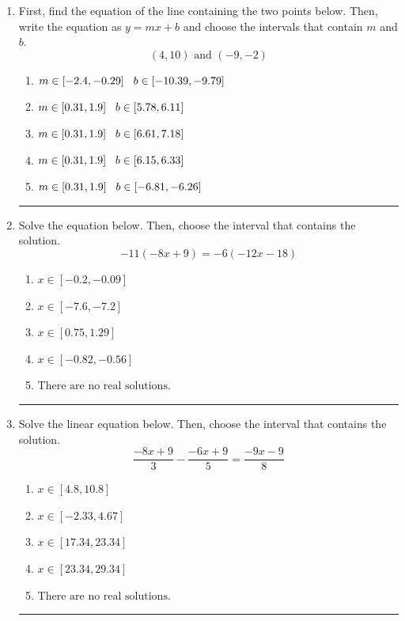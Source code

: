 \documentclass[14pt]{extbook}
\newcommand{\litem}[1]{\item#1\hspace*{-1cm}\rule{\textwidth}{0.4pt}}
\begin{document}
\begin{enumerate}
{\begin{enumerate}[label=\Alph*.]
\end{enumerate} }
\litem{
First, find the equation of the line containing the two points below. Then, write the equation as $ y=mx+b $ and choose the intervals that contain $m$ and $b$.\[ (4, 10) \text{ and } (-9, -2) \]\begin{enumerate}[label=\Alph*.]
\item \( m \in [-2.4, -0.29] \hspace*{3mm} b \in [-10.39, -9.79] \)
\item \( m \in [0.31, 1.9] \hspace*{3mm} b \in [5.78, 6.11] \)
\item \( m \in [0.31, 1.9] \hspace*{3mm} b \in [6.61, 7.18] \)
\item \( m \in [0.31, 1.9] \hspace*{3mm} b \in [6.15, 6.33] \)
\item \( m \in [0.31, 1.9] \hspace*{3mm} b \in [-6.81, -6.26] \)

\end{enumerate} }
\litem{
Solve the equation below. Then, choose the interval that contains the solution.\[ -11(-8x + 9) = -6(-12x -18) \]\begin{enumerate}[label=\Alph*.]
\item \( x \in [-0.2, -0.09] \)
\item \( x \in [-7.6, -7.2] \)
\item \( x \in [0.75, 1.29] \)
\item \( x \in [-0.82, -0.56] \)
\item \( \text{There are no real solutions.} \)

\end{enumerate} }

\litem{
Solve the linear equation below. Then, choose the interval that contains the solution.\[ \frac{-8x + 9}{3} - \frac{-6x + 9}{5} = \frac{-9x -9}{8} \]\begin{enumerate}[label=\Alph*.]
\item \( x \in [4.8, 10.8] \)
\item \( x \in [-2.33, 4.67] \)
\item \( x \in [17.34, 23.34] \)
\item \( x \in [23.34, 29.34] \)
\item \( \text{There are no real solutions.} \)


\end{enumerate}}
\end{enumerate}
\end{document}
